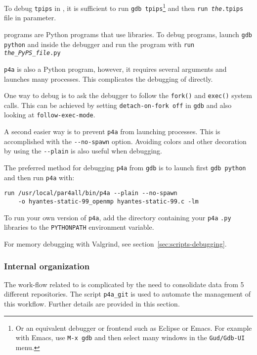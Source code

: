 \documentclass[a4paper]{article}
\begin{document}
To debug \texttt{tpips} in \Apfa, it is sufficient to run \texttt{gdb
  tpips}\footnote{Or an equivalent debugger or frontend such as Eclipse or
  Emacs. For example with Emacs, use \texttt{M-x gdb} and then select
  many windows in the \texttt{Gud/Gdb-UI} menu.} and then \texttt{run
  \emph{the}.tpips} file in parameter.

\Apyps programs are Python programs that use
\Apips libraries. To debug \Apyps programs, launch \texttt{gdb python}
and inside the debugger and run the program with \texttt{run
\emph{the\_PyPS\_file}.py}

\texttt{p4a} is also a Python program, however, it requires several
arguments and launches many processes. This complicates the debugging
of \Apips directly.

One way to debug \Apips is to ask the debugger to follow the
\texttt{fork()} and \texttt{exec()} system calls. This can be achieved
by setting \texttt{detach-on-fork off} in
\texttt{gdb} and also looking at \texttt{follow-exec-mode}.

A second easier way is to prevent \texttt{p4a} from launching
processes. This is accomplished with the \verb/--no-spawn/
option. Avoiding colors and other
decoration by using the \verb/--plain/ is also useful when debugging.

The preferred method for debugging \texttt{p4a} from \texttt{gdb} is
to launch first
\texttt{gdb python} and then run \texttt{p4a} with:
\begin{verbatim}
run /usr/local/par4all/bin/p4a --plain --no-spawn
    -o hyantes-static-99_openmp hyantes-static-99.c -lm
\end{verbatim}

To run your own version of \texttt{p4a}, add the directory
containing your \texttt{p4a} \texttt{.py} libraries to the
\texttt{PYTHONPATH} environment variable.

For memory debugging with Valgrind, see
section~\ref{sec:scripts-debugging}.


\subsubsection{Internal organization}
\label{sec:intern-organ}

The work-flow related to \Apips is complicated by the need to
consolidate data from 5 different \Asvn repositories. The script
\verb|p4a_git| is used to automate the management of this workflow.
Further details are provided in this section.
\end{document}
